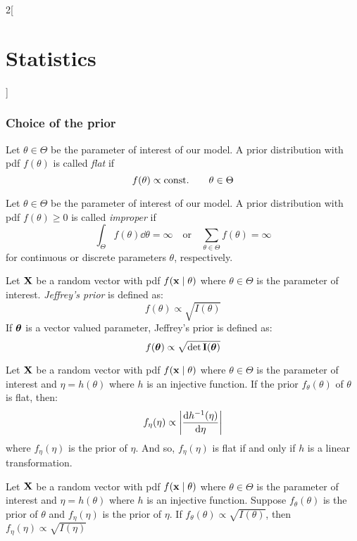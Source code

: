 \documentclass[../../../main_math.tex]{subfiles}
\begin{document}
\begin{multicols}{2}[\section{Statistics}]
  \subsubsection{Choice of the prior}
  \begin{definition}
    Let $\theta\in\Theta$ be the parameter of interest of our model. A prior distribution with pdf $f(\theta)$ is called \emph{flat} if $$f(\theta)\propto\text{const.}\qquad\theta\in\Theta$$
  \end{definition}
  \begin{definition}
    Let $\theta\in\Theta$ be the parameter of interest of our model. A prior distribution with pdf $f(\theta)\geq 0$ is called \emph{improper} if $$\int_\Theta f(\theta)\dd{\theta}=\infty\quad\text{or}\quad\sum_{\theta\in\Theta}f(\theta)=\infty$$ for continuous or discrete parameters $\theta$, respectively.
  \end{definition}
  \begin{definition}
    Let $\boldsymbol{\mathrm{X}}$ be a random vector with pdf $f(\boldsymbol{\mathrm{x}}\mid \theta)$ where $\theta\in\Theta$ is the parameter of interest. \emph{Jeffrey's prior} is defined as: $$f(\theta)\propto\sqrt{I(\theta)}$$
    If $\boldsymbol{\mathrm{\theta}}$ is a vector valued parameter, Jeffrey's prior is defined as: $$f(\boldsymbol{\mathrm{\theta}})\propto\sqrt{\det\boldsymbol{\mathrm{I}}(\boldsymbol{\mathrm{\theta}})}$$
  \end{definition}
  \begin{proposition}
    Let $\boldsymbol{\mathrm{X}}$ be a random vector with pdf $f(\boldsymbol{\mathrm{x}}\mid \theta)$ where $\theta\in\Theta$ is the parameter of interest and $\eta=h(\theta)$ where $h$ is an injective function. If the prior $f_\theta(\theta)$ of $\theta$ is flat, then: $$f_\eta(\eta)\propto\abs{\dv{h^{-1}(\eta)}{\eta}}$$ where $f_\eta(\eta)$ is the prior of $\eta$. And so, $f_\eta(\eta)$ is flat if and only if $h$ is a linear transformation.
  \end{proposition}
  \begin{proposition}
    Let $\boldsymbol{\mathrm{X}}$ be a random vector with pdf $f(\boldsymbol{\mathrm{x}}\mid \theta)$ where $\theta\in\Theta$ is the parameter of interest and $\eta=h(\theta)$ where $h$ is an injective function. Suppose $f_\theta(\theta)$ is the prior of $\theta$ and $f_\eta(\eta)$ is the prior of $\eta$. If $f_\theta(\theta)\propto\sqrt{I(\theta)}$, then $f_\eta(\eta)\propto\sqrt{I(\eta)}$
  \end{proposition}

\end{multicols}
\end{document}
